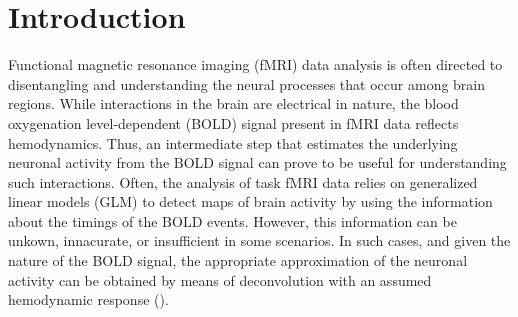 \section{Introduction}








Functional magnetic resonance imaging (fMRI) data analysis is often directed to disentangling and understanding the neural processes that occur among brain regions. While interactions in the brain are electrical in nature, the blood oxygenation level-dependent (BOLD) signal present in fMRI data reflects hemodynamics. Thus, an intermediate step that estimates the underlying neuronal activity from the BOLD signal can prove to be useful for understanding such interactions. Often, the analysis of task fMRI data relies on generalized linear models (GLM) to detect maps of brain activity by using the information about the timings of the BOLD events. However, this information can be unkown, innacurate, or insufficient in some scenarios. In such cases, and given the nature of the BOLD signal, the appropriate approximation of the neuronal activity can be obtained by means of deconvolution with an assumed hemodynamic response (\citealt{gitelman2003ModelingRegionalPsychophysiologic}).

